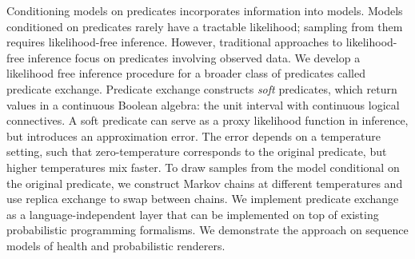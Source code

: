 








Conditioning models on predicates incorporates information
into models. 
Models conditioned on predicates rarely have a tractable likelihood; sampling from them requires likelihood-free inference.
However, traditional approaches to likelihood-free 
inference focus on predicates involving observed data.
We develop a likelihood free inference procedure for a broader class of
predicates called predicate exchange. 
Predicate exchange constructs \emph{soft} predicates, which return values in a continuous Boolean algebra: the unit interval with continuous logical connectives.
A soft predicate can serve as a proxy likelihood function in inference,
but introduces an approximation error.
The error depends on a temperature setting, such that zero-temperature corresponds to the original predicate, but higher temperatures mix faster.
To draw samples from the model conditional on the original predicate,
we construct Markov chains at different temperatures and use 
replica exchange to swap between chains.
We implement predicate exchange as a language-independent layer
that can be implemented on top of existing probabilistic programming formalisms. 
We demonstrate the approach on sequence models of health and probabilistic renderers.



% 